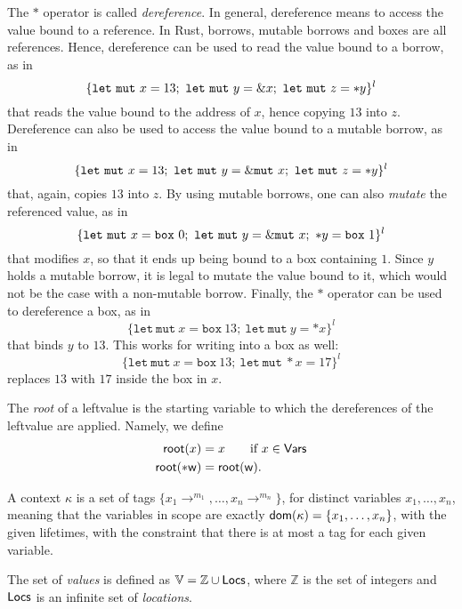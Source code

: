 The $*$ operator is called \emph{dereference}. In general, dereference means to access the
value bound to a reference. In Rust, borrows, mutable borrows and boxes are all references.
Hence, dereference can be used to read the value bound to a borrow, as in
\[
\{
\mathtt{let\ mut}\ x = 13;\
\mathtt{let\ mut}\ y = \& x;\
\mathtt{let\ mut}\ z = \mathtt{*}y
\}^l
\]
that reads the value bound to the address of $x$, hence copying $13$ into $z$.
Dereference can also be used to access the value bound to a mutable borrow, as in
\[
\{
\mathtt{let\ mut}\ x = 13;\
\mathtt{let\ mut}\ y = \&\mathtt{mut}\  x;\
\mathtt{let\ mut}\ z = \mathtt{*}y
\}^l
\]
that, again, copies $13$ into $z$.
By using mutable borrows, one can also \emph{mutate} the referenced value, as in
\[
\{
\mathtt{let\ mut}\ x = \mathtt{box}\ 0;\
\mathtt{let\ mut}\ y = \&\mathtt{mut}\  x;\
\mathtt{*}y = \mathtt{box}\ 1
\}^l
\]
that modifies $x$, so that it ends up being bound to a box containing $1$. Since $y$ holds a mutable borrow,
it is legal to mutate the value bound to it, which would not be the case with a non-mutable borrow.
Finally, the $*$ operator can be used to dereference a box, as in
\[
\{
\mathtt{let\ mut}\ x = \mathtt{box}\ 13;\
\mathtt{let\ mut}\ y = *x
\}^l
\]
that binds $y$ to $13$. This works for writing into a box as well:
\[
\{
\mathtt{let\ mut}\ x = \mathtt{box}\ 13;\
\mathtt{let\ mut}\ *x = 17
\}^l
\]
replaces $13$ with $17$ inside the box in $x$.

\begin{definition}\label{def:root}
  The \emph{root} of a leftvalue is the starting variable to which the dereferences of the
  leftvalue are applied. Namely, we define
  \begin{align*}
    \mathsf{root}(x) &= x\qquad\text{if $x\in\mathsf{Vars}$}\\
    \mathsf{root}(\mathtt{*}\mathsf{w}) &= \mathsf{root}(\mathsf{w}).
  \end{align*}
\end{definition}

\begin{definition}[Context]\label{def:context}
  A context $\kappa$ is a set of tags $\{x_1\to^{m_1},\ldots,x_n\to^{m_n}\}$,
  for distinct variables $x_1,\ldots,x_n$,
  meaning that the variables in scope are exactly
  $\mathsf{dom}(\kappa)=\{x_1,\ldots,x_n\}$, with the given lifetimes,
  with the constraint that there is at most a tag for each
  given variable.
\end{definition}

\begin{definition}[Values]\label{def:values}
  The set of \emph{values} is defined as $\mathbb{V}=\mathbb{Z}\cup\mathsf{Locs}$,
  where $\mathbb{Z}$ is the set of integers and
  $\mathsf{Locs}$ is an infinite set of \emph{locations}.
\end{definition}


